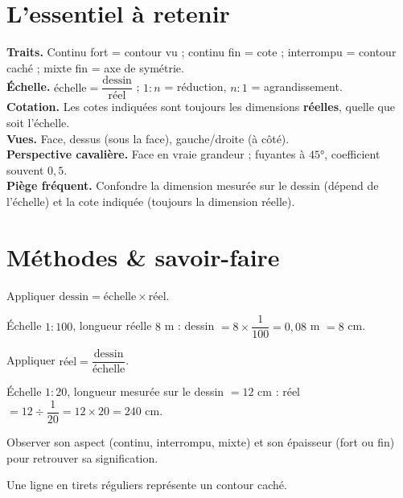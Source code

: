 \section{L'essentiel à retenir}

\begin{synthese}
\textbf{Traits.} Continu fort = contour vu ; continu fin = cote ; interrompu = contour
caché ; mixte fin = axe de symétrie.\\[4pt]
\textbf{Échelle.} $\text{échelle}=\dfrac{\text{dessin}}{\text{réel}}$ ; $1{:}n$ =
réduction, $n{:}1$ = agrandissement.\\[4pt]
\textbf{Cotation.} Les cotes indiquées sont toujours les dimensions \textbf{réelles},
quelle que soit l'échelle.\\[4pt]
\textbf{Vues.} Face, dessus (sous la face), gauche/droite (à côté).\\[4pt]
\textbf{Perspective cavalière.} Face en vraie grandeur ; fuyantes à $45°$, coefficient
souvent $0{,}5$.\\[4pt]
\textbf{Piège fréquent.} Confondre la dimension mesurée sur le dessin (dépend de
l'échelle) et la cote indiquée (toujours la dimension réelle).
\end{synthese}

\section{Méthodes \& savoir-faire}

Appliquer $\text{dessin}=\text{échelle}\times\text{réel}$.
\begin{exemple}
Échelle $1{:}100$, longueur réelle $8$ m : dessin $=8\times\dfrac1{100}=0{,}08$ m $=8$
cm.
\end{exemple}

Appliquer $\text{réel}=\dfrac{\text{dessin}}{\text{échelle}}$.
\begin{exemple}
Échelle $1{:}20$, longueur mesurée sur le dessin $=12$ cm : réel
$=12\div\dfrac1{20}=12\times20=240$ cm.
\end{exemple}

Observer son aspect (continu, interrompu, mixte) et son épaisseur (fort ou fin) pour
retrouver sa signification.
\begin{exemple}
Une ligne en tirets réguliers représente un contour caché.
\end{exemple}

